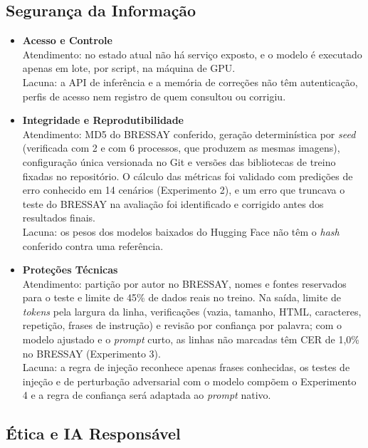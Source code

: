 \documentclass[12pt,a4paper]{article}
\begin{document}
\subsection{Segurança da Informação}

\begin{itemize}
    \item \textbf{Acesso e Controle} \\
    Atendimento: no estado atual não há serviço exposto, e o modelo é executado apenas em lote, por script, na máquina de GPU. \\
    Lacuna: a API de inferência e a memória de correções não têm autenticação, perfis de acesso nem registro de quem consultou ou corrigiu.

    \item \textbf{Integridade e Reprodutibilidade} \\
    Atendimento: MD5 do BRESSAY conferido, geração determinística por \emph{seed} (verificada com 2 e com 6 processos, que produzem as mesmas imagens), configuração única versionada no Git e versões das bibliotecas de treino fixadas no repositório. O cálculo das métricas foi validado com predições de erro conhecido em 14 cenários (Experimento 2), e um erro que truncava o teste do BRESSAY na avaliação foi identificado e corrigido antes dos resultados finais. \\
    Lacuna: os pesos dos modelos baixados do Hugging Face não têm o \emph{hash} conferido contra uma referência.

    \item \textbf{Proteções Técnicas} \\
    Atendimento: partição por autor no BRESSAY, nomes e fontes reservados para o teste e limite de 45\% de dados reais no treino. Na saída, limite de \emph{tokens} pela largura da linha, verificações (vazia, tamanho, HTML, caracteres, repetição, frases de instrução) e revisão por confiança por palavra; com o modelo ajustado e o \emph{prompt} curto, as linhas não marcadas têm CER de 1,0\% no BRESSAY (Experimento 3). \\
    Lacuna: a regra de injeção reconhece apenas frases conhecidas, os testes de injeção e de perturbação adversarial com o modelo compõem o Experimento 4 e a regra de confiança será adaptada ao \emph{prompt} nativo.
\end{itemize}

\subsection{Ética e IA Responsável}
\end{document}
